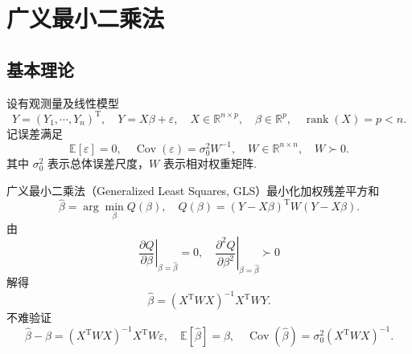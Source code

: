 \section{广义最小二乘法}
\subsection{基本理论}

设有观测量及线性模型
\begin{equation*}
	Y=(Y_1,\cdots,Y_n)^\mathrm{T},\quad Y=X\beta+\varepsilon,
	\quad X\in\mathbb{R}^{n\times p},\quad \beta\in\mathbb{R}^p,
	\quad \operatorname{rank}(X)=p<n.
\end{equation*}
记误差满足
\begin{equation*}
	\mathbb{E}[\varepsilon]=0,
	\quad \operatorname{Cov}(\varepsilon)=\sigma_0^2 W^{-1},
	\quad W\in\mathbb{R}^{n\times n},\quad W\succ0.
\end{equation*}
其中 \(\sigma_0^2\) 表示总体误差尺度，\(W\) 表示相对权重矩阵.

广义最小二乘法（Generalized Least Squares, GLS）最小化加权残差平方和
\begin{equation*}
	\hat{\beta}=\arg\min_{\beta}Q(\beta),
	\quad Q(\beta)=(Y-X\beta)^\mathrm{T}W(Y-X\beta).
\end{equation*}
由
\begin{equation*}
	\left.\frac{\partial Q}{\partial\beta}\right|_{\beta=\hat{\beta}}=0,
	\quad \left.\frac{\partial^2 Q}{\partial\beta^2}\right|_{\beta=\hat{\beta}}\succ0
\end{equation*}
解得
\begin{equation*}
	\hat{\beta}=(X^\mathrm{T}WX)^{-1}X^\mathrm{T}WY.
\end{equation*}
不难验证
\begin{equation*}
	\hat{\beta}-\beta=(X^\mathrm{T}WX)^{-1}X^\mathrm{T}W\varepsilon,
	\quad \mathbb{E}[\hat{\beta}]=\beta,
	\quad \operatorname{Cov}(\hat{\beta})=\sigma_0^2(X^\mathrm{T}WX)^{-1}.
\end{equation*}

